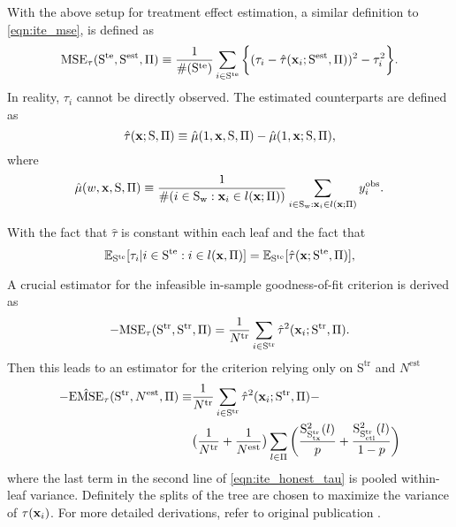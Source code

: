     With the above setup for treatment effect estimation, a similar definition to \ref{eqn:ite_mse}, is defined as
    \begin{equation}
      \label{eqn:ite_tau_mse}
      \mathrm{MSE}_\tau (\mathrm{S^{te}}, \mathrm{S^{est}}, \Pi) \equiv \frac{1}{\# (\mathrm{S^{te}})} \sum_{i 
      \in \mathrm{S^{te}}} \bigg \{ (\tau_i - \hat{\tau}(\mathbf{x}_i; \mathrm{S^{est}}, \Pi) )^2  - \tau_i^2 \bigg \}.
    \end{equation}
    In reality, $\tau_i$ cannot be directly observed. The estimated counterparts are defined as 
    \begin{equation}
        \hat{\tau}(\mathbf{x}; \mathrm{S}, \Pi) \equiv \hat{\mu}(1, \mathbf{x}, \mathrm{S}, \Pi) - \hat{\mu}(1, \mathbf{x}; \mathrm{S}, \Pi),
    \end{equation}
    where 
    \begin{equation*}
      \hat{\mu}(w, \mathbf{x}, \mathrm{S}, \Pi) \equiv \frac{1}{\#(i \in \mathrm{S_w}: \mathbf{x}_i \in l(\mathbf{x}; \Pi))} \sum_{i \in \mathrm{S_w}: \mathbf{x}_i \in l(\mathbf{x}; \Pi)} y_i^{\mathrm{obs}}.
    \end{equation*}
    
    With the fact that $\hat{\tau}$ is constant within each leaf and the fact that 
    \begin{equation*}
      \mathbb{E}_{\mathrm{S^{te}}} [ \tau_i | i \in \mathrm{S^{te}}: i \in l(\mathbf{x}, \Pi) ] = \mathbb{E}_{\mathrm{S^{te}}} [ \hat{\tau} (\mathbf{x}; \mathrm{S^{te}}, \Pi)],
    \end{equation*}
    
    A crucial estimator for the infeasible in-sample goodness-of-fit criterion is derived as 
    \begin{equation}
      - \mathrm{MSE}_\tau (\mathrm{S^{tr}}, \mathrm{S^{tr}}, \Pi) = \frac{1}{N^{\mathrm{tr}}} \sum_{i \in \mathrm{S^{tr}}} \hat{\tau}^2 (\mathbf{x}_i; \mathrm{S^{tr}}, \Pi).
    \end{equation}
    Then this leads to an estimator for the criterion relying only on $\mathrm{S^{tr}}$ and $N^{\mathrm{est}}$
    \begin{equation}
      \label{eqn:ite_honest_tau}
      \begin{split}
        - \hat{\mathrm{EMSE}}_\tau (\mathrm{S^{tr}}, N^{\mathrm{est}}, \Pi) \equiv & \frac{1}{N^{\mathrm{tr}}} \sum_{i \in \mathrm{S^{tr}}} \hat{\tau}^2 (\mathbf{x}_i; \mathrm{S^{tr}}, \Pi) - \\
          & \big( \frac{1}{N^{\mathrm{tr}}} + \frac{1}{N^{\mathrm{est}}} \big) \sum_{l \in \Pi} \bigg(  \frac{\mathrm{S}_{\mathrm{S_{tx}^{tr}}}^2 (l)}{p} + \frac{\mathrm{S}_{\mathrm{S_{ctl}^{tr}}}^2 (l)}{1-p} \bigg)
      \end{split}
    \end{equation}
    where the last term in the second line of \ref{eqn:ite_honest_tau} is pooled within-leaf variance. Definitely the splits of the tree are chosen to maximize the variance of $\tau(\mathbf{x}_i)$. For more detailed derivations, refer to original publication \cite{athey2016recursive}.


